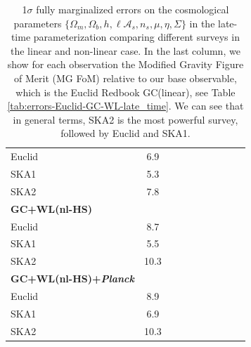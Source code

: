 \begin{table}[htbp]
\begin{tabular}{|l|c|c|c|c|c||c|c|c|c|}
Euclid  

& 6.9
\tabularnewline
SKA1  

& 5.3
\tabularnewline
SKA2 

& 7.8
\tabularnewline
\hline 
\hline 
\textbf{GC+WL(nl-HS)} &  &  &  &  &  &  &  & & \Tstrut\tabularnewline
Euclid  

& 8.7
\tabularnewline
SKA1  

& 5.5
\tabularnewline
SKA2 

& 10.3
\tabularnewline
\hline
\hline
\textbf{GC+WL(nl-HS)+{\it Planck}} &  &  &  &  &  &  &  & & \Tstrut\tabularnewline
Euclid  

& 8.9
\tabularnewline 
SKA1  

& 6.9
\tabularnewline 
SKA2 

& 10.3
\tabularnewline
\hline
\end{tabular}
\small
\protect\caption[1$\sigma$ marginalized errors for Euclid, DESI-ELG, SKA1 and SKA2 forecasts in the late-time parameterization.]{\label{tab:errors-GC-SKAcompare-MG-DE-mu-eta-sigma}
1$\sigma$ fully
marginalized errors on the cosmological parameters
$\{\Omega_{m},\Omega_{b},h,\ell \mathcal{A}_{s},n_{s},\mu,\eta, \Sigma\}$
in the late-time parameterization comparing different surveys in the linear and non-linear case. 
In the last column, we show for each observation the Modified Gravity Figure of Merit (MG FoM) relative to our base observable, which is the Euclid Redbook GC(linear), see Table \ref{tab:errors-Euclid-GC-WL-late_time}.
We can see that in general terms, SKA2 is the most powerful survey, followed by Euclid and SKA1.
}
\end{table}
